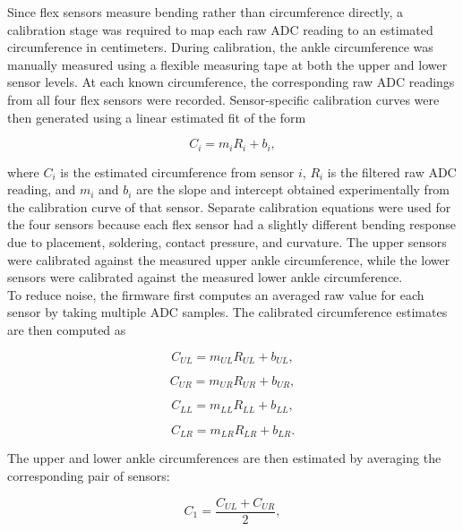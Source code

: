 \noindent Since flex sensors measure bending rather than circumference directly, a calibration stage was required to map each raw ADC reading to an estimated circumference in centimeters. During calibration, the ankle circumference was manually measured using a flexible measuring tape at both the upper and lower sensor levels. At each known circumference, the corresponding raw ADC readings from all four flex sensors were recorded. Sensor-specific calibration curves were then generated using a linear estimated fit of the form

\begin{equation}
    C_i = m_i R_i + b_i,
    \label{eq:flex_calibration}
\end{equation}

\noindent where $C_i$ is the estimated circumference from sensor $i$, $R_i$ is the filtered raw ADC reading, and $m_i$ and $b_i$ are the slope and intercept obtained experimentally from the calibration curve of that sensor. Separate calibration equations were used for the four sensors because each flex sensor had a slightly different bending response due to placement, soldering, contact pressure, and curvature. The upper sensors were calibrated against the measured upper ankle circumference, while the lower sensors were calibrated against the measured lower ankle circumference. \\


\noindent To reduce noise, the firmware first computes an averaged raw value for each sensor by taking multiple ADC samples. The calibrated circumference estimates are then computed as

\begin{equation}
    C_{UL} = m_{UL}R_{UL} + b_{UL},
\end{equation}

\begin{equation}
    C_{UR} = m_{UR}R_{UR} + b_{UR},
\end{equation}

\begin{equation}
    C_{LL} = m_{LL}R_{LL} + b_{LL},
\end{equation}

\begin{equation}
    C_{LR} = m_{LR}R_{LR} + b_{LR}.
\end{equation}

\noindent The upper and lower ankle circumferences are then estimated by averaging the corresponding pair of sensors:

\begin{equation}
    C_1 = \frac{C_{UL} + C_{UR}}{2},
    \label{eq:upper_circ}
\end{equation}

